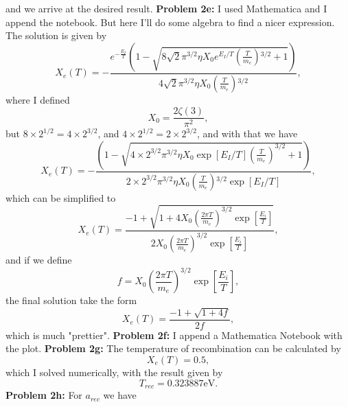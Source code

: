 \documentclass[11pt]{article}
\begin{document}
and we arrive at the desired result.
\newline
\textbf{Problem 2e:} I used Mathematica and I append the notebook. But here I'll do some algebra to find a nicer expression. 
The solution is given by
\begin{displaymath}
X_e(T)  = -\frac{e^{-\frac{E_I}{T}} \left(1-\sqrt{8 \sqrt{2} \pi
   ^{3/2} \eta  X_0 e^{E_I/T}
   \left(\frac{T}{m_e}\right){}^{3/2}+1}\right)}{4 \sqrt{2} \pi
   ^{3/2} \eta  X_0
   \left(\frac{T}{m_e}\right){}^{3/2}},
\end{displaymath}
where I defined 
\begin{displaymath}
  X_0 = \frac{2\zeta(3)}{\pi^2},
\end{displaymath}
but $8\times2^{1/2}=4\times2^{3/2}$, and $4\times 2^{1/2} = 2\times 2^{3/2}$, and with that we have
\begin{displaymath}
  X_e(T)  = -\frac{ \left(1 -\sqrt{4\times2^{3/2} \pi^{3/2} \eta  X_0 \exp[E_I/T] 
   \left(\frac{T}{m_e}^{}\right)^{3/2}+1}\right)}{2\times 2^{3/2} \pi
   ^{3/2} \eta  X_0 \left(\frac{T}{m_e}\right){}^{3/2}\exp[E_I/T]},
\end{displaymath}
which can be simplified to
\begin{displaymath}
  X_e(T) = \frac{-1+\sqrt{1 + 4 X_0\left(\frac{2\pi T}{m_e}\right)^{3/2} \exp\left[\frac{E_i}{T}\right]}}{2X_0\left(\frac{2\pi T}{m_e}\right)^{3/2} \exp\left[\frac{E_i}{T}\right]},
\end{displaymath}
and if we define 
\begin{displaymath}
  f = X_0\left(\frac{2\pi T}{m_e}\right)^{3/2} \exp\left[\frac{E_i}{T}\right],
\end{displaymath}
the final solution take the form
\begin{displaymath}
  X_e(T) = \frac{-1 + \sqrt{1+4f}}{2f},
\end{displaymath}
which is much "prettier".
\newline
\textbf{Problem 2f:} I append a Mathematica Notebook with the plot.
\newline
\textbf{Problem 2g:} The temperature of recombination can be calculated by
\begin{displaymath}
  X_e(T)=0.5,
\end{displaymath}
which I solved numerically, with the result given by
\begin{displaymath}
  T_{rec}=0.323887 \text{eV}.
\end{displaymath}
\newline
\textbf{Problem 2h:} For $a_{rec}$ we have
\end{document}
